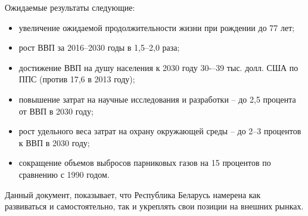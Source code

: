 \documentclass[14pt,a4paper]{article}
\begin{document}
    \par
    Ожидаемые результаты следующие:
    \begin{itemize}
        \item увеличение ожидаемой продолжительности жизни при рождении до 77 лет;
        \item рост ВВП за 2016--2030 годы в 1,5–2,0 раза;
        \item достижение ВВП на душу населения к 2030 году 30-–39 тыс. долл. США по ППС (против 17,6 в 2013 году);
        \item повышение затрат на научные исследования и разработки – до 2,5 процента от ВВП в 2030 году;
        \item рост удельного веса затрат на охрану окружающей среды – до 2--3 процентов к ВВП в 2030 году;
        \item сокращение объемов выбросов парниковых газов на 15 процентов по сравнению с 1990 годом.
    \end{itemize}
    \par
    Данный документ, показывает, что Республика Беларусь намерена как развиваться и самостоятельно, так и укреплять свои позиции на внешних рынках.
\end{document}
